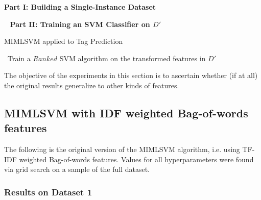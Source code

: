 \begin{algorithm}[H]
\LinesNotNumbered
{}
\BlankLine
 \textbf{Part I: Building a Single-Instance Dataset}
 
\ 
   \BlankLine
  \BlankLine
 \textbf{Part II: Training an SVM Classifier on $D'$}
 \caption{MIMLSVM applied to Tag Prediction \citep{shen_etal_2009} }
\ Train a $Ranked$ SVM algorithm on the transformed features in $D'$
\end{algorithm}

\hfill \break

The objective of the experiments in this section is to ascertain whether (if at all) the original results generalize to other kinds of features.

\subsection{MIMLSVM with IDF weighted Bag-of-words features}

The following is the original version of the MIMLSVM algorithm, i.e. using TF-IDF weighted Bag-of-words features. Values for all hyperparameters were found via grid search on a sample of the full dataset.

\subsubsection{Results on Dataset 1}

